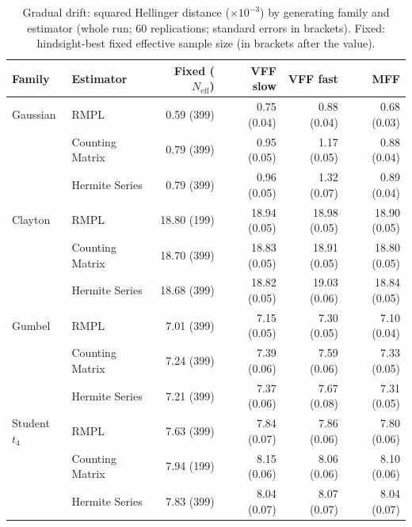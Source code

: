 \begin{table}[htbp]
\centering
\small
\caption{Gradual drift: squared Hellinger distance ($\times10^{-3}$) by generating family and estimator (whole run; 60 replications; standard errors in brackets). Fixed: hindsight-best fixed effective sample size (in brackets after the value).}
\label{tab:app-strategy-h2-drift}
\begin{tabular}{llrrrr}
\toprule
Family & Estimator & Fixed ($N_{\mathrm{eff}}$) & VFF slow & VFF fast & MFF \\
\midrule
Gaussian & RMPL & 0.59 (399) & 0.75 (0.04) & 0.88 (0.04) & 0.68 (0.03) \\
 & Counting Matrix & 0.79 (399) & 0.95 (0.05) & 1.17 (0.05) & 0.88 (0.04) \\
 & Hermite Series & 0.79 (399) & 0.96 (0.05) & 1.32 (0.07) & 0.89 (0.04) \\
\addlinespace
Clayton & RMPL & 18.80 (199) & 18.94 (0.05) & 18.98 (0.05) & 18.90 (0.05) \\
 & Counting Matrix & 18.70 (399) & 18.83 (0.05) & 18.91 (0.05) & 18.80 (0.05) \\
 & Hermite Series & 18.68 (399) & 18.82 (0.05) & 19.03 (0.06) & 18.84 (0.05) \\
\addlinespace
Gumbel & RMPL & 7.01 (399) & 7.15 (0.05) & 7.30 (0.05) & 7.10 (0.04) \\
 & Counting Matrix & 7.24 (399) & 7.39 (0.06) & 7.59 (0.06) & 7.33 (0.05) \\
 & Hermite Series & 7.21 (399) & 7.37 (0.06) & 7.67 (0.08) & 7.31 (0.05) \\
\addlinespace
Student $t_4$ & RMPL & 7.63 (399) & 7.84 (0.07) & 7.86 (0.06) & 7.80 (0.06) \\
 & Counting Matrix & 7.94 (199) & 8.15 (0.06) & 8.06 (0.06) & 8.10 (0.06) \\
 & Hermite Series & 7.83 (399) & 8.04 (0.07) & 8.07 (0.07) & 8.04 (0.07) \\
\bottomrule
\end{tabular}
\end{table}

